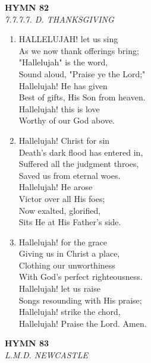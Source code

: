 \newpage
\begin{center}
    {\Large \textbf{HYMN 82}}
    \\
    \textit{7.7.7.7. D. THANKSGIVING}
\end{center}
\vspace{1em}

\begin{enumerate}
    \item HALLELUJAH! let us sing \\
        As we now thank offerings bring; \\
        "Hallelujah" is the word, \\
        Sound aloud, "Praise ye the Lord;" \\
        Hallelujah! He has given \\
        Best of gifts, His Son from heaven. \\
        Hallelujah! this is love \\
        Worthy of our God above.

    \item Hallelujah! Christ for sin \\
        Death's dark flood has entered in, \\
        Suffered all the judgment throes, \\
        Saved us from eternal woes. \\
        Hallelujah! He arose \\
        Victor over all His foes; \\
        Now exalted, glorified, \\
        Sits He at His Father's side.

    \item Hallelujah! for the grace \\
        Giving us in Christ a place, \\
        Clothing our unworthiness \\
        With God's perfect righteousness. \\
        Hallelujah! let us raise \\
        Songs resounding with His praise; \\
        Hallelujah! strike the chord, \\
        Hallelujah! Praise the Lord. Amen.

\end{enumerate}

\newpage
\begin{center}
    {\Large \textbf{HYMN 83}}
    \\
    \textit{L.M.D. NEWCASTLE}
\end{center}
\vspace{1em}

